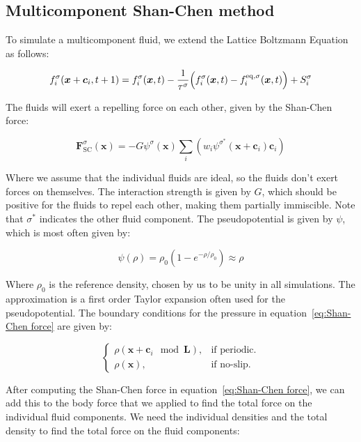 \subsection{Multicomponent Shan-Chen method}
To simulate a multicomponent fluid, we extend the Lattice Boltzmann Equation as follows:

\begin{equation}\label{eq:Lattice Boltzmann Equation multicomponent}
    f_i^{\sigma}(\bm{x} + \bm{c}_i, t + 1) = f_i^{\sigma}(\bm{x}, t) - \frac{1}{\tau^{\sigma}}\Bigl(f_i^{\sigma}(\bm{x}, t) - f_i^{\text{eq}, \sigma}(\bm{x}, t)\Bigr) + S_i^{\sigma} 
\end{equation}

The fluids will exert a repelling force on each other, given by the Shan-Chen force:

\begin{equation}\label{eq:Shan-Chen force}
    \bm{F}^{\sigma}_{\text{SC}}(\bm{x}) = -G \psi^{\sigma}(\bm{x}) \sum_i \left(w_i \psi^{\sigma^\ast}(\bm{x} + \bm{c}_i) \bm{c}_i \right) 
\end{equation}

Where we assume that the individual fluids are ideal, so the fluids don't exert forces on themselves. The interaction strength is given by $G$, which should be positive for the fluids to repel each other, making them partially immiscible. Note that $\sigma^\ast$ indicates the other fluid component. The pseudopotential is given by $\psi$, which is most often given by:

\begin{equation}\label{eq:Pseudopotential}
    \psi(\rho) = \rho_0 \left(1 - e^{-\rho/\rho_0}\right) \approx \rho
\end{equation}

Where $\rho_0$ is the reference density, chosen by us to be unity in all simulations. The approximation is a first order Taylor expansion often used for the pseudopotential. The boundary conditions for the pressure in equation~\ref{eq:Shan-Chen force} are given by:

\begin{equation}
\begin{cases}
    \rho(\bm{x} + \bm{c}_i \mod\bm{L}), & \text{if periodic.}\\
    \rho(\bm{x}), & \text{if no-slip.}
\end{cases}
\end{equation}

After computing the Shan-Chen force in equation~\ref{eq:Shan-Chen force}, we can add this to the body force that we applied to find the total force on the individual fluid components. We need the individual densities and the total density to find the total force on the fluid components:

